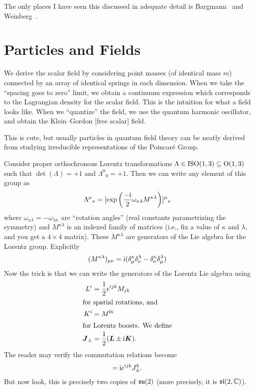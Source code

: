 \begin{remark}
The only places I have seen this discussed in adequate detail is 
Bargmann~\cite{Bargmann:1964zj} and Weinberg~\cite{Weinberg:1995mt}.
\end{remark}

\section{Particles and Fields}

We derive the scalar field by considering point masses (of identical
mass $m$) connected by an array of identical springs in each
dimension. When we take the ``spacing goes to zero'' limit, we obtain a
continuum expression which corresponds to the Lagrangian density for the
scalar field. This is the intuition for what a field looks like. When we
``quantize'' the field, we use the quantum harmonic oscillator, and
obtain the Klein--Gordon [free scalar] field.

This is cute, but usually particles in quantum field theory can be
neatly derived from studying irreducible representations of the Poincar\'{e} Group.

Consider proper orthochronous Lorentz transformations
$\Lambda\in\mathrm{ISO}(1,3)\subseteq\mathrm{O}(1,3)$ such that $\det(\Lambda)=+1$ and
${\Lambda^{0}}_{0}=+1$. Then we can write any element of this group as
\begin{equation}
{\Lambda^{\mu}}_{\nu} = [\exp\left(\frac{-\mathrm{i}}{2}\omega_{\kappa\lambda}M^{\kappa\lambda}\right)]{{}^{\mu}}_{\nu}
\end{equation}
where $\omega_{\kappa\lambda}=-\omega_{\lambda\kappa}$ are ``rotation
angles'' (real constants parametrizing the symmetry) and
$M^{\kappa\lambda}$ is an indexed family of matrices (i.e., fix a value
of $\kappa$ and $\lambda$, and you get a $4\times4$ matrix). These $M^{\kappa\lambda}$ are
generators of the Lie algebra for the Lorentz group. Explicitly
\begin{equation}
(M^{\kappa\lambda})_{\mu\nu} = \mathrm{i}(\delta^{\kappa}_{\mu}\delta^{\lambda}_{\nu}-\delta^{\kappa}_{\nu}\delta^{\lambda}_{\mu})
\end{equation}
Now the trick is that we can write the generators of the Lorentz Lie
algebra using
\begin{subequations}
\begin{align}
L^{i} &= \frac{1}{2}\epsilon^{ijk}M_{jk}\\
\intertext{for spatial rotations, and}
K^{i} &= M^{0i}\\
\intertext{for Lorentz boosts. We define}
\boldsymbol{J}_{\pm} &= \frac{1}{2}(\boldsymbol{L}\pm\mathrm{i}\boldsymbol{K}).
\end{align}
\end{subequations}
The reader may verify the commutation relations become
\begin{equation}
[J^{i}_{\pm}, J^{j}_{\pm}] = \I\epsilon^{ijk}J^{k}_{\pm}.
\end{equation}
But now look, this is precisely two copies of $\mathfrak{su}(2)$ (more precisely,
it is $\mathfrak{sl}(2,\mathbb{C})$).

